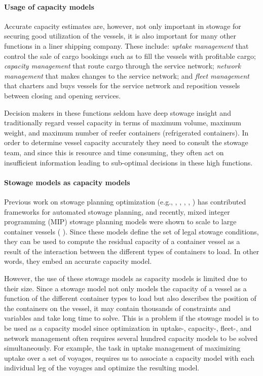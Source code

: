 \paragraph{Usage of capacity models}
Accurate capacity estimates are, however, not only important in stowage 
for securing good utilization of the vessels,
it is also important for many other functions in a liner shipping company. These include: {\em uptake management} that control the sale of cargo bookings such as to fill the vessels with profitable cargo; {\em capacity management} that route cargo through the service network; {\em network management} that makes changes to the service network; and {\em fleet management} that charters and buys vessels for the service network and reposition vessels between closing and opening services.  

Decision makers in these functions seldom have deep stowage insight and traditionally regard vessel capacity in terms of maximum volume, maximum weight, and maximum number of reefer containers (refrigerated containers). In order to determine vessel capacity accurately they need to consult the stowage team, and since this is resource and time consuming, they often act on insufficient information leading to sub-optimal decisions in these high functions.  

\paragraph{Stowage models as capacity models}
Previous work on stowage planning optimization (e.g., \cite{roach00}, \cite{kimkang02}, \cite{ambrosino04},  \cite{delgado09}, \cite{pacino12}) has contributed frameworks for automated stowage planning, 
and recently, mixed integer programming (MIP) stowage planning models were shown to scale to large container vessels (\cite{pacino11} ). Since these models define the set of legal stowage conditions, they can be used to compute the residual capacity of a container vessel as a result of the interaction between the different types of containers to load. In other words, they embed an accurate capacity model. 

However, the use of these stowage models as capacity models is limited due to their size. Since a stowage model not only models the capacity of a vessel as a function of the different container types to load but also describes the position of the containers on the vessel, it may contain thousands of constraints and variables and take long time to solve. This is a problem if the stowage model is to be used as a capacity model %
since optimization in uptake-, capacity-, fleet-, and network management often requires several hundred capacity models to be solved simultaneously. For example, the task in uptake management of maximizing uptake over a set of voyages, requires us to associate a capacity model with each individual leg of the voyages and optimize the resulting model.  

